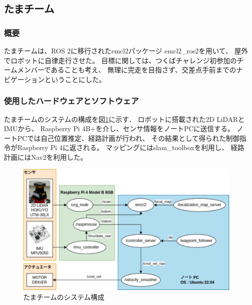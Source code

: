 \documentclass[twocolumn,9pt]{jsproceedings}
\begin{document}
\subsection{たまチーム}\label{sub:localization}
\subsubsection{概要}
たまチームは、ROS 2に移行されたemcl2パッケージ\cite{emcl2}
emcl2\_ros2\cite{emcl2_ros2}を用いて、
屋外でロボットに自律走行させた。
目標に関しては、つくばチャレンジ初参加のチームメンバーであることも考え、
無理に完走を目指さず、交差点手前までのナビゲーションということにした。

\subsubsection{使用したハードウェアとソフトウェア}

たまチームのシステムの構成を図\ref{fig:tama_system_diagram}に示す．
ロボットに搭載された2D LiDARとIMUから、
Raspberry Pi 4B+を介し、センサ情報をノートPCに送信する。
ノートPCでは自己位置推定、経路計画が行われ、
その結果として得られた制御指令がRaspberry Pi 4に返される。
マッピングにはslam\_toolboxを利用し、
経路計画にはNav2を利用した。

\begin{figure}[h]
  \begin{center}
    \includegraphics[width=1.0\linewidth]{figs/tama_system_diagram.pdf}
    \caption{たまチームのシステム構成}
    \label{fig:tama_system_diagram}
  \end{center}
\end{figure}
\end{document}
